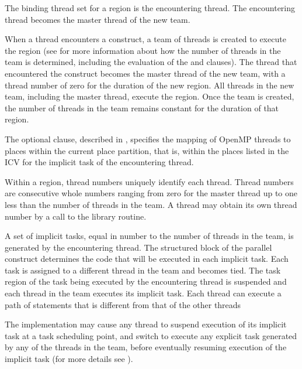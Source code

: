 \binding
The binding thread set for a  region is the encountering thread. The 
encountering thread becomes the master thread of the new team.

\descr
When a thread encounters a  construct, a team of threads is created to 
execute the  region (see 
for more information about 
how the number of threads in the team is determined, including the evaluation of the 
and  clauses). The thread that encountered the  construct 
becomes the master thread of the new team, with a thread number of zero for the 
duration of the new  region. All threads in the new team, including the 
master thread, execute the region. Once the team is created, the number of threads in the 
team remains constant for the duration of that  region.

The optional  clause, described in 
, specifies the 
mapping of OpenMP threads to places within the current place partition, that is, within 
the places listed in the  ICV for the implicit task of the encountering 
thread.

Within a  region, thread numbers uniquely identify each thread. Thread 
numbers are consecutive whole numbers ranging from zero for the master thread up to 
one less than the number of threads in the team. A thread may obtain its own thread 
number by a call to the  library routine.

A set of implicit tasks, equal in number to the number of threads in the team, is 
generated by the encountering thread. The structured block of the parallel construct 
determines the code that will be executed in each implicit task. Each task is assigned to 
a different thread in the team and becomes tied. The task region of the task being 
executed by the encountering thread is suspended and each thread in the team executes 
its implicit task. Each thread can execute a path of statements that is different from that 
of the other threads

The implementation may cause any thread to suspend execution of its implicit task at a 
task scheduling point, and switch to execute any explicit task generated by any of the 
threads in the team, before eventually resuming execution of the implicit task (for more 
details see ).

